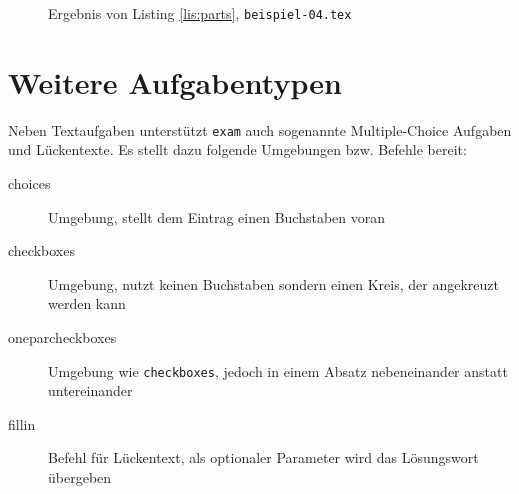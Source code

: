 \begin{figure}[b]
\caption{Ergebnis von Listing \ref{lis:parts}, \texttt{beispiel-04.tex}}\label{fig:allparts}
\end{figure}


\section{Weitere Aufgabentypen}

Neben Textaufgaben unterstützt \texttt{exam} auch sogenannte Multiple-Choice Aufgaben und Lückentexte. 
Es stellt dazu folgende Umgebungen bzw. Befehle bereit:

\begin{description}
\item[choices] Umgebung, stellt dem Eintrag einen Buchstaben voran
\item[checkboxes] Umgebung, nutzt keinen Buchstaben sondern einen  Kreis, der angekreuzt werden kann
\item[oneparcheckboxes] Umgebung wie \texttt{checkboxes}, jedoch in einem Absatz nebeneinander anstatt untereinander
\item[fillin] Befehl für Lückentext, als optionaler Parameter wird das Lösungswort übergeben
\end{description}

